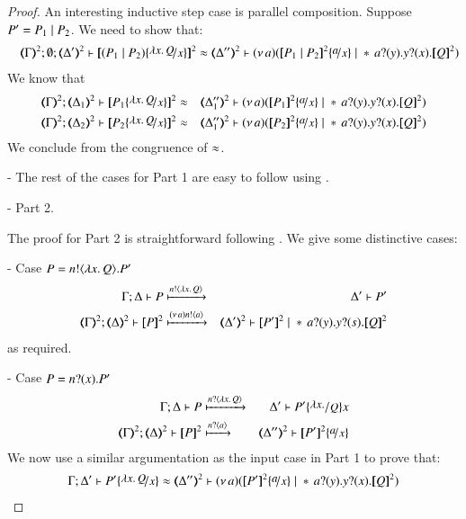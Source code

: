 \begin{proof}
	\noi An interesting inductive step case is parallel composition. Suppose $P' = P_1 \;|\; P_2$. We need to show that:
%
	\begin{eqnarray*}
		&& \tmap{\Gamma}{2}; \es; \tmap{\Delta'}{2} \proves \pmap{(P_1 \Par P_2) \subst{\abs{x}{Q}}{x}}{2} \wb
		\tmap{\Delta''}{2} \proves \newsp{a}{\pmap{P_1 \Par P_2}{2} \subst{a}{x} \Par \repl{} \binp{a}{y} \binp{y}{x} \pmap{Q}{2}}
	\end{eqnarray*}
%
	\noi We know that
%
	\begin{eqnarray*}
		\horel{\tmap{\Gamma}{2}}{\tmap{\Delta_1}{2}}{\pmap{P_1\subst{\abs{x}{Q}}{x}}{2}}{&\wb&}
		{\tmap{\Delta_1''}{2}}{\newsp{a}{\pmap{P_1}{2} \subst{a}{x} \Par \repl{} \binp{a}{y} \binp{y}{x} \pmap{Q}{2}}}\\
		\horel{\tmap{\Gamma}{2}}{\tmap{\Delta_2}{2}}{\pmap{P_2\subst{\abs{x}{Q}}{x}}{2}}{&\wb&}
		{\tmap{\Delta_1''}{2}}{\newsp{a}{\pmap{P_2}{2} \subst{a}{x} \Par \repl{} \binp{a}{y} \binp{y}{x} \pmap{Q}{2}}}
	\end{eqnarray*}
%
	\noi We conclude from the congruence of $\approx$.

	\noi - The rest of the cases for Part 1 are easy to follow using .

	\noi - Part 2.

	\noi The proof for Part 2 is straightforward following .
	We give some distinctive cases:

	\noi - Case $P = n ! \langle \lambda x.\,Q \rangle . P'$
%
	\begin{eqnarray*}
		\horel{\Gamma}{\Delta}{P}{&\hby{\bactout{n}{\abs{x}{Q}}}&}{\Delta'}{P'}\\
		\horel{\tmap{\Gamma}{2}}{\tmap{\Delta}{2}}{\pmap{P}{2}}{& \hby{\news{a} \bactout{n}{a}}&}{\tmap{\Delta'}{2}}{\pmap{P'}{2} \Par \repl{} \binp{a}{y} \binp{y}{s} \pmap{Q}{2}}
	\end{eqnarray*}
%
	\noi as required.

	\noi - Case $P = n ? (x) . P'$
%
	\begin{eqnarray*}
		\horel{\Gamma}{\Delta}{P}{&\hby{\bactinp{n}{\abs{x}{Q}}}&}{\Delta'}{P' \subst{\abs{x}}{Q}}{x}\\
		\horel{\tmap{\Gamma}{2}}{\tmap{\Delta}{2}}{\pmap{P}{2}}{& \hby{\bactinp{n}{a}}&}{\tmap{\Delta''}{2}}{\pmap{P'}{2} \subst{a}{x}}
	\end{eqnarray*}
%
	\noi We now use a similar argumentation as the input case in Part 1 to prove that:
%
	\begin{eqnarray*}
		\horel{\Gamma}{\Delta'}{P' \subst{\abs{x}{Q}}{x}}
		{\wb}
		{\tmap{\Delta''}{2}}{\newsp{a}{\pmap{P'}{2} \subst{a}{x} \Par \repl{} \binp{a}{y} \binp{y}{x} \pmap{Q}{2}}}
	\end{eqnarray*}
%
\end{proof}

